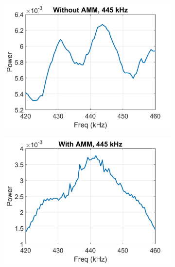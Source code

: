 \documentclass{article}
\begin{document}
\begin{figure}[!htb]
    \centering
    \begin{subfigure}{0.32\textwidth}
        \centering
        \includegraphics[width = \textwidth]{../../matlab/exp/fig/CalPowTransCoef_230302C_PowVoid.jpg}
    \end{subfigure}
    \begin{subfigure}{0.32\textwidth}
        \centering
        \includegraphics[width = \textwidth]{../../matlab/exp/fig/CalPowTransCoef_230302C_PowAMM.jpg}
    \end{subfigure}
    \begin{subfigure}{0.32\textwidth}
        \centering

\end{subfigure}
\end{figure}
\end{document}
